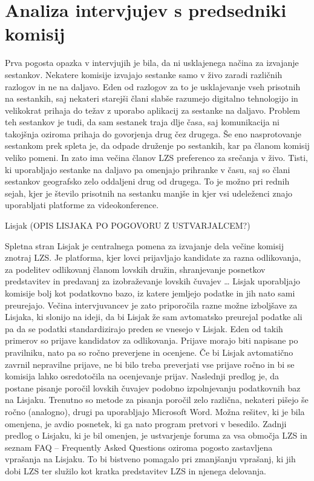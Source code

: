 \documentclass[a4paper,12pt,openright]{book}
\begin{document}
\section{Analiza intervjujev s predsedniki komisij}

Prva pogosta opazka v intervjujih je bila, da ni usklajenega načina za izvajanje sestankov. 
Nekatere komisije izvajajo sestanke samo v živo zaradi različnih razlogov in ne na daljavo. 
Eden od razlogov za to je usklajevanje vseh prisotnih na sestankih, saj nekateri starejši člani slabše razumejo digitalno tehnologijo in velikokrat prihaja do težav z uporabo aplikacij za sestanke na daljavo. 
Problem teh sestankov je tudi, da sam sestanek traja dlje časa, saj komunikacija ni takojšnja oziroma prihaja do govorjenja drug čez drugega. 
Še eno nasprotovanje sestankom prek spleta je, da odpade druženje po sestankih, kar pa članom komisij veliko pomeni. 
In zato ima večina članov LZS preferenco za srečanja v živo.
Tisti, ki uporabljajo sestanke na daljavo pa omenjajo prihranke v času, saj so člani sestankov geografsko zelo oddaljeni drug od drugega. 
To je možno pri rednih sejah, kjer je število prisotnih na sestanku manjše in kjer vsi udeleženci znajo uporabljati platforme za videokonference.

Lisjak
	(OPIS LISJAKA PO POGOVORU Z USTVARJALCEM?)
 
Spletna stran Lisjak je centralnega pomena za izvajanje dela večine komisij znotraj LZS. 
Je platforma, kjer lovci prijavljajo kandidate za razna odlikovanja, za podelitev odlikovanj članom lovskih družin, shranjevanje posnetkov predstavitev in predavanj za izobraževanje lovskih čuvajev …
Lisjak uporabljajo komisije bolj kot podatkovno bazo, iz katere jemljejo podatke in jih nato sami preurejajo. 
Večina intervjuvancev je zato priporočila razne možne izboljšave za Lisjaka, ki slonijo na ideji, da bi Lisjak že sam avtomatsko preurejal podatke ali pa da se podatki standardizirajo preden se vnesejo v Lisjak.  
Eden od takih primerov so prijave kandidatov za odlikovanja.
Prijave morajo biti napisane po pravilniku, nato pa so ročno preverjene in ocenjene. 
Če bi Lisjak avtomatično zavrnil nepravilne prijave, ne bi bilo treba preverjati vse prijave ročno in bi se komisija lahko osredotočila na ocenjevanje prijav. 
Naslednji predlog je, da postane pisanje poročil lovskih čuvajev podobno izpolnjevanju podatkovnih baz na Lisjaku.
Trenutno so metode za pisanja poročil zelo različna, nekateri pišejo še ročno (analogno), drugi pa uporabljajo Microsoft Word.
Možna rešitev, ki je bila omenjena, je avdio posnetek, ki ga nato program pretvori v besedilo. 
Zadnji predlog o Lisjaku, ki je bil omenjen, je ustvarjenje foruma za vsa območja LZS in seznam FAQ –  Frequently Asked Questions oziroma pogosto zastavljena vprašanja na Lisjaku. 
To bi bistveno pomagalo pri zmanjšanju vprašanj, ki jih dobi LZS ter služilo kot kratka predstavitev LZS in njenega delovanja.
\end{document}
